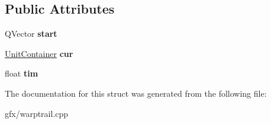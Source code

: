\subsection*{Public Attributes}
\begin{DoxyCompactItemize}
\item 
Q\+Vector {\bfseries start}\hypertarget{structWarpTrail_a3b4b15ade3dad384ff0e18e2179974c9}{}\label{structWarpTrail_a3b4b15ade3dad384ff0e18e2179974c9}

\item 
\hyperlink{classUnitContainer}{Unit\+Container} {\bfseries cur}\hypertarget{structWarpTrail_af297f8ef82937dad9493f9c9748e3029}{}\label{structWarpTrail_af297f8ef82937dad9493f9c9748e3029}

\item 
float {\bfseries tim}\hypertarget{structWarpTrail_a40f2f3aaba62168a87091321a86448a0}{}\label{structWarpTrail_a40f2f3aaba62168a87091321a86448a0}

\end{DoxyCompactItemize}


The documentation for this struct was generated from the following file\+:\begin{DoxyCompactItemize}
\item 
gfx/warptrail.\+cpp\end{DoxyCompactItemize}
